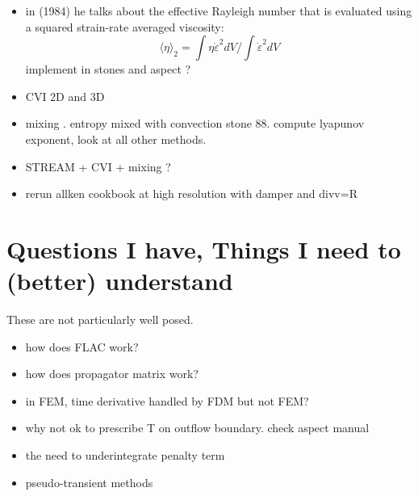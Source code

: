 \documentclass[a4paper]{article}
\begin{document}
\begin{itemize}
\item in \textcite{chri84} (1984) he talks about the effective Rayleigh number 
that is evaluated using a squared strain-rate averaged viscosity:
\[
\langle \eta \rangle_2 = \int \eta \dot{\varepsilon}^2 dV/\int \dot{\varepsilon}^2 dV
\]
implement in stones and aspect ?

\item CVI 2D and 3D

\item mixing . entropy mixed with convection stone 88. compute lyapunov exponent, look at all other methods.

\item STREAM + CVI + mixing ?

\item rerun allken cookbook at high resolution with damper and divv=R

\end{itemize}

\newpage
\section{Questions I have, Things I need to (better) understand}

These are not particularly well posed. 

\begin{itemize}
\item how does FLAC work?
\item how does propagator matrix work?
\item in FEM, time derivative handled by FDM but not FEM?
\item why not ok to prescribe T on outflow boundary. check aspect manual
\item the need to underintegrate penalty term
\item pseudo-transient methods
\end{itemize}
\end{document}
